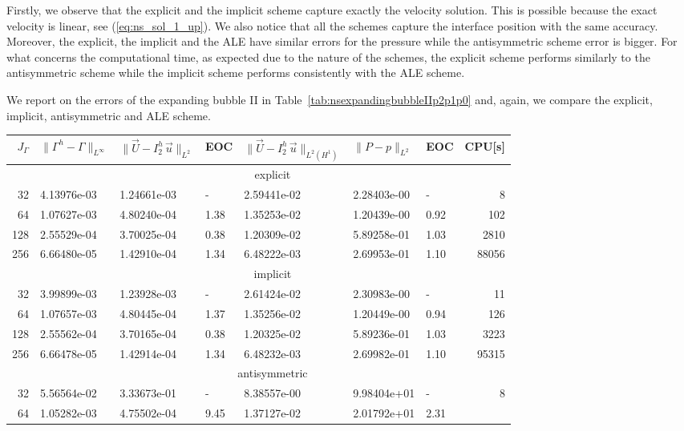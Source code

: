 \documentclass[a4paper,12pt,onecolumn]{article}
\newcommand{\errorXx}{\|\Gamma^h - \Gamma\|_{L^\infty}}
\newcommand{\LerrorUu}[1]{\|\vec U - I^h_{#1}\,\vec u\|_{L^2}}
\newcommand{\HerrorUu}[1]{\|\vec U - I^h_{#1}\,\vec u\|_{L^2(H^1)}}
\newcommand{\LerrorPp}{\|P - p\|_{L^2}}
\begin{document}
Firstly, we observe that the explicit and the implicit scheme capture exactly
the velocity solution. This is possible because the exact velocity is linear,
see (\ref{eq:ns_sol_1_up}). We  also notice that all the schemes capture the
interface position with the same accuracy. Moreover, the explicit, the implicit
and the ALE have similar errors for the pressure while the antisymmetric scheme
error is bigger. For what concerns the computational time, as expected due to
the nature  of the schemes, the explicit scheme performs similarly to the
antisymmetric scheme while the implicit scheme performs consistently with the
ALE scheme.

We report on the errors of the expanding bubble II in
Table~\ref{tab:nsexpandingbubbleIIp2p1p0} and, again, we compare the explicit,
implicit, antisymmetric and ALE scheme.
\begin{table}
\center
\hspace*{-3.25cm}
\begin{tabular}{rllllllr}
\hline
$J_\Gamma$ & $\errorXx$ & $\LerrorUu2$ & EOC & $\HerrorUu2$ & $\LerrorPp$ & EOC
& CPU[s] \\
\hline
& \multicolumn{7}{c}{explicit} \\
\hline
 32 & 4.13976e-03 & 1.24661e-03 &    - & 2.59441e-02 & 2.28403e-00 &    - &
8 \\
 64 & 1.07627e-03 & 4.80240e-04 & 1.38 & 1.35253e-02 & 1.20439e-00 & 0.92 &
102 \\
128 & 2.55529e-04 & 3.70025e-04 & 0.38 & 1.20309e-02 & 5.89258e-01 & 1.03 &
2810 \\
256 & 6.66480e-05 & 1.42910e-04 & 1.34 & 6.48222e-03 & 2.69953e-01 & 1.10 &
88056 \\
\hline
& \multicolumn{7}{c}{implicit} \\
\hline
 32 & 3.99899e-03 & 1.23928e-03 &    - & 2.61424e-02 & 2.30983e-00 &    - &
11 \\
 64 & 1.07657e-03 & 4.80445e-04 & 1.37 & 1.35256e-02 & 1.20449e-00 & 0.94 &
126 \\
128 & 2.55562e-04 & 3.70165e-04 & 0.38 & 1.20325e-02 & 5.89236e-01 & 1.03 &
3223 \\
256 & 6.66478e-05 & 1.42914e-04 & 1.34 & 6.48232e-03 & 2.69982e-01 & 1.10 &
95315 \\
\hline
& \multicolumn{7}{c}{antisymmetric} \\
\hline
 32 & 5.56564e-02 & 3.33673e-01 &    - & 8.38557e-00 & 9.98404e+01 &    - &
8 \\
 64 & 1.05282e-03 & 4.75502e-04 & 9.45 & 1.37127e-02 & 2.01792e+01 & 2.31 &

\end{tabular}
\end{table}
\end{document}
